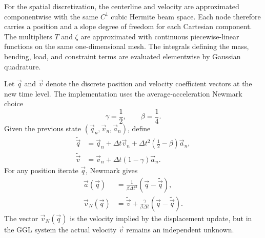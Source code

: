 For the spatial discretization, the centerline and velocity are approximated
componentwise with the same \(C^1\) cubic Hermite beam space. Each node
therefore carries a position and a slope degree of freedom for each Cartesian
component. The multipliers \(T\) and \(\zeta\) are approximated with
continuous piecewise-linear functions on the same one-dimensional mesh. The
integrals defining the mass, bending, load, and constraint terms are evaluated
elementwise by Gaussian quadrature.

Let \(\vec q\) and \(\vec v\) denote the discrete position and velocity
coefficient vectors at the new time level. The implementation uses the
average-acceleration Newmark choice
\begin{equation*}
    \gamma = \frac12,
    \qquad
    \beta = \frac14.
\end{equation*}
Given the previous state \((\vec q_n,\vec v_n,\vec a_n)\), define
\begin{align}
    \tilde{\vec q}
     & =
    \vec q_n
    + \Delta t \vec v_n
    + \Delta t^2\left(\frac12-\beta\right)\vec a_n, \\
    \tilde{\vec v}
     & =
    \vec v_n
    + \Delta t(1-\gamma)\vec a_n.
\end{align}
For any position iterate \(\vec q\), Newmark gives
\begin{align}
    \vec a(\vec q)
     & =
    \frac{1}{\beta\Delta t^2}
    \left(\vec q-\tilde{\vec q}\right), \\
    \vec v_N(\vec q)
     & =
    \tilde{\vec v}
    +
    \frac{\gamma}{\beta\Delta t}
    \left(\vec q-\tilde{\vec q}\right).
\end{align}
The vector \(\vec v_N(\vec q)\) is the velocity implied by the displacement
update, but in the GGL system the actual velocity \(\vec v\) remains an
independent unknown.

